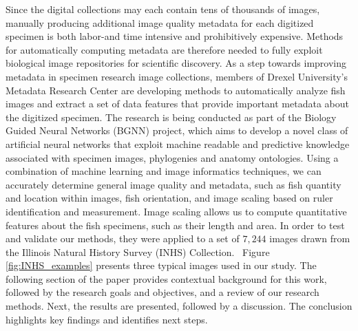 \documentclass[conference]{IEEEtran}
\begin{document}
Since the digital collections may each contain tens of thousands of images, manually producing additional image quality metadata for each digitized specimen is both labor-and time intensive and prohibitively expensive. Methods for automatically computing metadata are therefore needed to fully exploit biological image repositories for scientific discovery.
As a step towards improving metadata in specimen research image collections, members of Drexel University's Metadata Research Center are developing methods to automatically analyze fish images and
extract a set of data features that provide important metadata about the
digitized specimen.
The research is being conducted as part of the Biology Guided Neural Networks (BGNN) project, which aims to develop a novel class of artificial neural networks that exploit machine readable and predictive knowledge associated with specimen images, phylogenies and anatomy ontologies.
Using a combination of machine learning and image informatics 
techniques,
we can accurately determine general image quality and metadata, such as fish quantity and location within images, fish orientation, and
image scaling based on ruler identification and measurement. Image scaling
allows us to compute quantitative features about the fish specimens, such
as their length and area.  In order to test and validate our methods, they
were  applied to a set of \(7,244\)
images drawn from the Illinois Natural History Survey (INHS) Collection.~\cite{INHS}
Figure \ref{fig:INHS_examples} presents three typical images used in our
study.
The following section of the paper provides contextual background for this work, followed by the research goals and objectives, and a review of our research methods. Next, the results are presented, followed by a discussion. The conclusion highlights key findings and identifies next steps.
\end{document}

